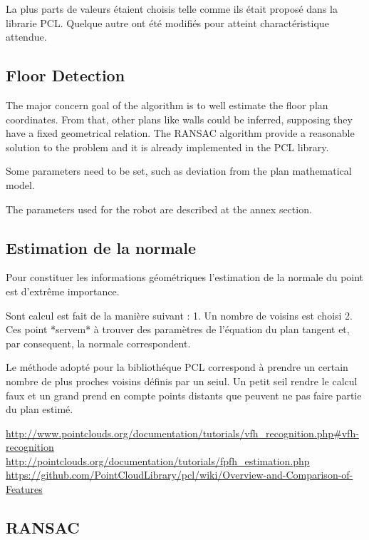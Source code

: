 La plus parts de valeurs étaient choisis telle comme ils était proposé dans la librarie PCL. Quelque autre ont été modifiés pour atteint charactéristique attendue.



\subsection { Floor Detection } 

The major concern goal of the algorithm is to well estimate the floor plan coordinates. From that, other plans like walls could be inferred, supposing they have a fixed geometrical relation. The RANSAC algorithm provide a reasonable solution to the problem and it is already implemented in the PCL library.

Some parameters need to be set, such as deviation from the plan mathematical model.

The parameters used for the robot are described at the annex section.


\subsection{Estimation de la normale}

Pour constituer les informations géométriques l'estimation de la normale du point est d'extrême importance. 

Sont calcul est fait de la manière suivant :
1. Un nombre de voisins est choisi 
2. Ces point *servem* à trouver des paramètres de l'équation du plan tangent et, par consequent, la normale correspondent.

Le méthode adopté pour la bibliothéque PCL correspond à prendre un certain nombre de plus proches voisins définis par un seiul. Un petit seil rendre le calcul faux et un grand prend en compte points distants que peuvent ne pas faire partie du plan estimé.

\url{http://www.pointclouds.org/documentation/tutorials/vfh_recognition.php#vfh-recognition} \\

\url{http://pointclouds.org/documentation/tutorials/fpfh_estimation.php} \\

\url{https://github.com/PointCloudLibrary/pcl/wiki/Overview-and-Comparison-of-Features} \\

\subsection { RANSAC } 

